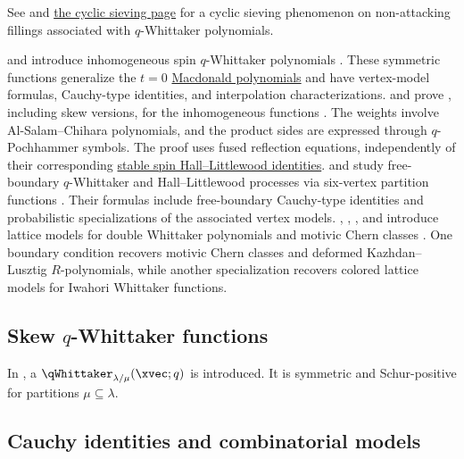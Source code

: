 See \cite{Uhlin2019,AlexanderssonUhlin2020} and
\hyperref[cspMacdonaldE]{the cyclic sieving page}
for a cyclic sieving phenomenon on non-attacking fillings associated with
$q$-Whittaker polynomials.

 and  introduce inhomogeneous
spin $q$-Whittaker polynomials \cite{BorodinKorotkikh2021x}.  These symmetric
functions generalize the $t=0$ \hyperref[macdonaldP]{Macdonald polynomials}
and have vertex-model formulas, Cauchy-type identities, and interpolation
characterizations.
 and  prove
\label{spinWhittakerLittlewood}, including skew versions,
for the inhomogeneous functions \cite[Thm.~7.1]{GavrilovaKorotkikh2026x}.
The weights involve Al-Salam--Chihara polynomials, and the product sides
are expressed through $q$-Pochhammer symbols. The proof uses fused
reflection equations, independently of their corresponding
\hyperref[stableSpinHallLittlewoodFunction]{stable spin Hall--Littlewood identities}.
 and  study free-boundary
$q$-Whittaker and Hall--Littlewood processes via six-vertex partition
functions \cite{HeWheeler2025x}.  Their formulas include free-boundary
Cauchy-type identities and probabilistic specializations of the associated
vertex models.
, , , and
 introduce lattice models for double Whittaker polynomials
and motivic Chern classes \cite{BrubakerBumpHardtSpink2025x}.  One boundary
condition recovers motivic Chern classes and deformed Kazhdan--Lusztig
$R$-polynomials, while another specialization recovers colored lattice models
for Iwahori Whittaker functions.


\subsection[skewqWhittaker]{Skew $q$-Whittaker functions}

In \cite{AlexanderssonUhlin2020}, a 
\label{skewQWhittakerFunction} $\qWhittaker_{\lambda/\mu}(\xvec;q)$ is
introduced.  It is symmetric and Schur-positive for partitions
$\mu \subseteq \lambda$.


\subsection[qWhittakerModels]{Cauchy identities and combinatorial models}

